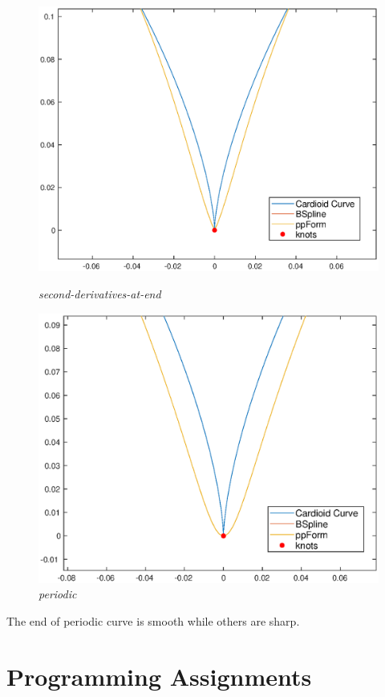 \documentclass[11pt,en]{elegantpaper}
\begin{document}
\begin{figure}[htbp]
\begin{minipage}[t]{0.24\linewidth}
        \includegraphics[width=0.9\linewidth]{figure/curve_cardioid_second-derivatives-at-end_local.eps}
        \caption{\textit{second-derivatives-at-end}}
        \label{fig:side:c}
    \end{minipage}%
    \begin{minipage}[t]{0.24\linewidth}
        \centering
        \includegraphics[width=0.9\linewidth]{figure/curve_cardioid_periodic_local.eps}
        \caption{\textit{periodic}}
        \label{fig:side:c}
    \end{minipage}%
\end{figure}

The end of periodic curve is smooth while others are sharp.

\section{Programming Assignments}
\end{document}
